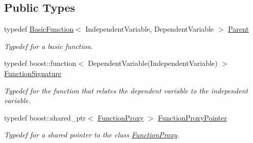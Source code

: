 \subsection*{Public Types}
\begin{DoxyCompactItemize}
\item 
typedef \hyperlink{classtudat_1_1basic__mathematics_1_1BasicFunction}{Basic\+Function}$<$ Independent\+Variable, Dependent\+Variable $>$ \hyperlink{classtudat_1_1basic__mathematics_1_1FunctionProxy_a36e77082724d43941643c7c32523a319}{Parent}
\begin{DoxyCompactList}\small\item\em Typedef for a basic function. \end{DoxyCompactList}\item 
typedef boost\+::function$<$ Dependent\+Variable(Independent\+Variable) $>$ \hyperlink{classtudat_1_1basic__mathematics_1_1FunctionProxy_a1861c20597dcc1cbce1e7c455f2d82a9}{Function\+Signature}
\begin{DoxyCompactList}\small\item\em Typedef for the function that relates the dependent variable to the independent variable. \end{DoxyCompactList}\item 
typedef boost\+::shared\+\_\+ptr$<$ \hyperlink{classtudat_1_1basic__mathematics_1_1FunctionProxy}{Function\+Proxy} $>$ \hyperlink{classtudat_1_1basic__mathematics_1_1FunctionProxy_ab350957b6bb15fb811624a5ffc0ab60f}{Function\+Proxy\+Pointer}\hypertarget{classtudat_1_1basic__mathematics_1_1FunctionProxy_ab350957b6bb15fb811624a5ffc0ab60f}{}\label{classtudat_1_1basic__mathematics_1_1FunctionProxy_ab350957b6bb15fb811624a5ffc0ab60f}

\begin{DoxyCompactList}\small\item\em Typedef for a shared pointer to the class \hyperlink{classtudat_1_1basic__mathematics_1_1FunctionProxy}{Function\+Proxy}. \end{DoxyCompactList}\end{DoxyCompactItemize}
